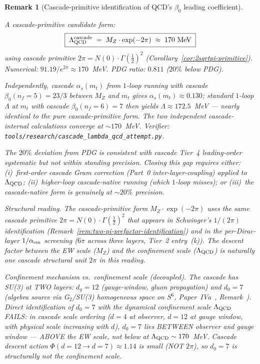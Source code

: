 \documentclass[12pt,a4paper]{article}
\newtheorem*{remark}{Remark}
\begin{document}
\begin{remark}[Cascade-primitive identification of QCD's $\beta_0$ leading coefficient]
\begin{itemize}[nosep]
A cascade-primitive candidate form:
\[
\boxed{\;\Lambda_{\rm QCD}^{\rm cascade} \;=\; M_Z\cdot\exp(-2\pi) \;\approx\; 170~\text{MeV}\;}
\]
using cascade primitive $2\pi = N(0)\cdot\Gamma(\tfrac{1}{2})^2$
(Corollary~\ref{cor:2sqrtpi-primitive}). Numerical: $91.19/e^{2\pi}
\approx 170$~MeV. PDG ratio: $0.811$ ($20\%$ below PDG).

Independently, cascade $\alpha_s(m_t)$ from $1$-loop running with
cascade $\beta_0(n_f=5) = 23/3$ between $M_Z$ and $m_t$ gives
$\alpha_s(m_t) \approx 0.130$; standard $1$-loop $\Lambda$ at $m_t$
with cascade $\beta_0(n_f=6) = 7$ then yields $\Lambda \approx 172.5$~MeV
--- nearly identical to the pure cascade-primitive form. The two
independent cascade-internal calculations converge at $\sim 170$~MeV.
Verifier:
\texttt{tools/research/cascade\_lambda\_qcd\_attempt.py}.

The $20\%$ deviation from PDG is consistent with cascade Tier~4
leading-order systematic but not within standing precision. Closing
this gap requires either: (i)~first-order cascade Gram correction
(Part~0 inter-layer-coupling) applied to $\Lambda_{\rm QCD}$;
(ii)~higher-loop cascade-native running (which $1$-loop misses);
or (iii)~the cascade-native form is genuinely at $\sim 20\%$ precision.

\medskip\noindent\emph{Structural reading.} The cascade-primitive
form $M_Z\cdot\exp(-2\pi)$ uses the same cascade primitive
$2\pi = N(0)\cdot\Gamma(\tfrac{1}{2})^2$ that appears in
Schwinger's $1/(2\pi)$ identification (Remark~\ref{rem:two-pi-prefactor-identification})
and in the per-Dirac-layer $1/\alpha_{\rm em}$ screening
($6\pi$ across three layers, Tier~2 entry~(k)). The descent factor
between the EW scale ($M_Z$) and the confinement scale
($\Lambda_{\rm QCD}$) is naturally one cascade structural unit
$2\pi$ in this reading.

\medskip\noindent\emph{Confinement mechanism vs.\ confinement scale (decoupled).}
The cascade has SU(3) at TWO layers: $d_g = 12$ (gauge-window,
gluon propagation) and $d_0 = 7$ (algebra source via G$_2$/SU(3)
homogeneous space on $S^6$, Paper~IVa~\cite{part4a}, Remark~).
Direct identification of $d_0 = 7$ with the dynamical confinement
scale $\Lambda_{\rm QCD}$ FAILS: in cascade scale ordering
($d=4$ at observer, $d=12$ at gauge window, with physical scale
increasing with $d$), $d_0=7$ lies BETWEEN observer and gauge
window --- ABOVE the EW scale, not below at $\Lambda_{\rm QCD}
\sim 170$~MeV. Cascade descent action $\Phi(d=12 \to d=7) \approx 1.14$
is small (NOT $2\pi$), so $d_0 = 7$ is structurally not the
confinement scale.


\end{itemize}
\end{remark}
\end{document}

